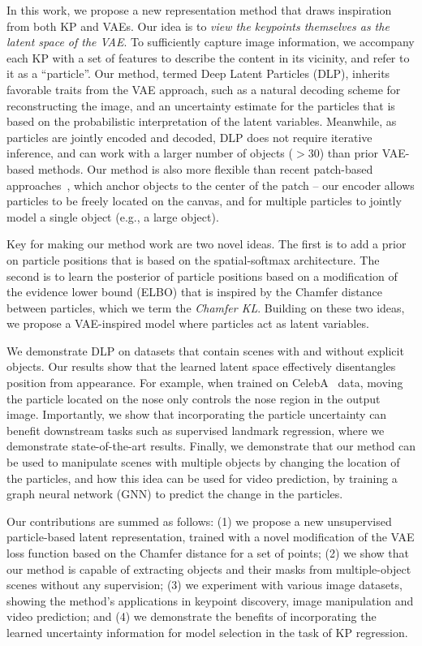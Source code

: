 \documentclass[nohyperref]{article}
\theoremstyle{plain}
\theoremstyle{definition}
\theoremstyle{remark}
\begin{document}
In this work, we propose a new representation method that draws inspiration from both KP and VAEs. Our idea is to \textit{view the keypoints themselves as the latent space of the VAE}. To sufficiently capture image information, we accompany each KP with a set of features to describe the content in its vicinity, and refer to it as a ``particle''. Our method, termed Deep Latent Particles (DLP), inherits favorable traits from the VAE approach, such as a natural decoding scheme for reconstructing the image, and an uncertainty estimate for the particles that is based on the probabilistic interpretation of the latent variables. Meanwhile, 
as particles are jointly encoded and decoded, DLP does not require iterative inference, and can work with a larger number of objects ($>30$) than prior VAE-based methods. Our method is also more flexible than recent patch-based approaches~\citep{smirnov2021marionette, lin2020space}, which anchor objects to the center of the patch -- our encoder allows particles to be freely located on the canvas, and for multiple particles to jointly model a single object (e.g., a large object).

Key for making our method work are two novel ideas. The first is to add a prior on particle positions that is based on the spatial-softmax architecture. The second is to learn the posterior of particle positions based on a modification of the evidence lower bound (ELBO) that is inspired by the Chamfer distance between particles, which we term the \textit{Chamfer KL}. Building on these two ideas, we propose a VAE-inspired model where particles act as latent variables.


We demonstrate DLP on datasets that contain scenes with and without explicit objects. Our results show that the learned latent space effectively disentangles position from appearance. For example, when trained on CelebA~\citep{liu2015faceattributes} data, moving the particle located on the nose only controls the nose region in the output image.
Importantly, we show that incorporating the particle uncertainty can benefit downstream tasks such as supervised landmark regression, where we demonstrate state-of-the-art results. Finally, we demonstrate that our method can be used to manipulate scenes with multiple objects by changing the location of the particles, and how this idea can be used for video prediction, by training a graph neural network (GNN) to predict the change in the particles.


Our contributions are summed as follows: (1) we propose a new unsupervised particle-based latent representation, trained with a novel modification of the VAE loss function based on the Chamfer distance for a set of points; (2) we show that our method is capable of extracting objects and their masks from multiple-object scenes without any supervision; (3) we experiment with various image datasets, showing the method's applications in keypoint discovery, image manipulation and video prediction; and (4) we demonstrate the benefits of incorporating the learned uncertainty information for model selection in the task of KP regression.
\end{document}
